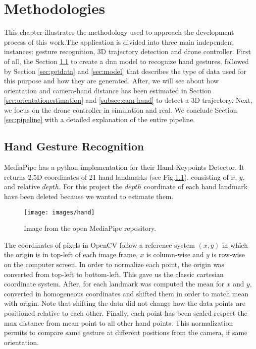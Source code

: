 \chapter{Methodologies}
\label{chap:methods}

This chapter illustrates the methodology used to approach the development process of this work.The application is divided into three main independent instances: gesture recognition, 3D trajectory detection and drone controller. First of all, the Section \ref{sec:handgestrec} to create a \gls{dnn} model to recognize hand gestures, followed by Section \ref{sec:getdata} and \ref{sec:model} that describes the type of data used for this purpose and how they are generated. After, we will see about how orientation and camera-hand distance has been estimated in Section \ref{sec:orientationestimation} and \ref{subsec:cam-hand} to detect a 3D trajectory. Next, we focus on the drone controller in simulation and real. We conclude Section \ref{sec:pipeline} with a detailed explanation of the entire pipeline.


\section{Hand Gesture Recognition}
\label{sec:handgestrec}
MediaPipe has a python implementation for their Hand Keypoints Detector. It returns 2.5D coordinates of 21 hand landmarks (see Fig.\ref{fig:handland}), consisting of $x$, $y$, and relative $depth$. For this project the $depth$ coordinate of each hand landmark have been deleted because we wanted to estimate them.


\begin{figure}[H]
	\centering
	\texttt{[image: images/hand]}
	\caption[Hand Landmarks.]{Image from the open MediaPipe repository.}
	\label{fig:handland}
\end{figure}

\noindent The coordinates of pixels in OpenCV follow a reference system $(x,y)$ in which the origin is in top-left of each image frame, $x$ is column-wise and $y$ is row-wise on the computer screen. In order to normalize each point, the origin was converted from top-left to bottom-left. This gave us the classic cartesian coordinate system. After, for each landmark was computed the mean for $x$ and $y$, converted in homogeneous coordinates and shifted them in order to match mean with origin. Note that shifting the data did not change how the data points are positioned relative to each other. Finally, each point has been scaled respect the max distance from mean point to all other hand points. This normalization permits to compare same gesture at different positions from the camera, if same orientation. 

